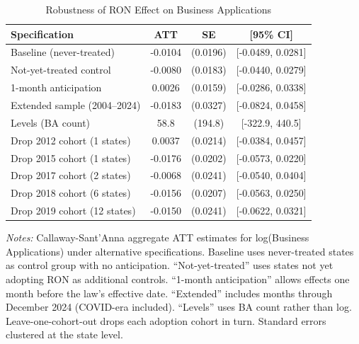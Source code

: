 \begin{table}[t]
\centering
\caption{Robustness of RON Effect on Business Applications}
\label{tab:robust}
\begin{tabular}{l cc c}
\hline\hline
Specification & ATT & SE & [95\% CI] \\
\hline
Baseline (never-treated) & -0.0104 & (0.0196) & [-0.0489, 0.0281] \\
Not-yet-treated control & -0.0080 & (0.0183) & [-0.0440, 0.0279] \\
1-month anticipation & 0.0026 & (0.0159) & [-0.0286, 0.0338] \\
Extended sample (2004--2024) & -0.0183 & (0.0327) & [-0.0824, 0.0458] \\
Levels (BA count) & 58.8 & (194.8) & [-322.9, 440.5] \\
Drop 2012 cohort (1 states) & 0.0037 & (0.0214) & [-0.0384, 0.0457] \\
Drop 2015 cohort (1 states) & -0.0176 & (0.0202) & [-0.0573, 0.0220] \\
Drop 2017 cohort (2 states) & -0.0068 & (0.0241) & [-0.0540, 0.0404] \\
Drop 2018 cohort (6 states) & -0.0156 & (0.0207) & [-0.0563, 0.0250] \\
Drop 2019 cohort (12 states) & -0.0150 & (0.0241) & [-0.0622, 0.0321] \\
\hline\hline
\end{tabular}
\begin{tablenotes}[flushleft]
\small
\item \textit{Notes:} Callaway-Sant'Anna aggregate ATT estimates for log(Business Applications) under alternative specifications. Baseline uses never-treated states as control group with no anticipation. ``Not-yet-treated'' uses states not yet adopting RON as additional controls. ``1-month anticipation'' allows effects one month before the law's effective date. ``Extended'' includes months through December 2024 (COVID-era included). ``Levels'' uses BA count rather than log. Leave-one-cohort-out drops each adoption cohort in turn. Standard errors clustered at the state level.
\end{tablenotes}
\end{table}

